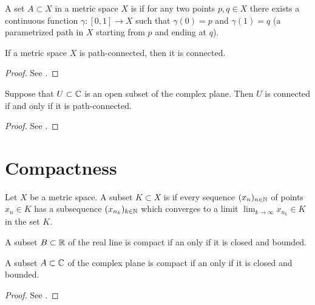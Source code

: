 \begin{definition}
  \label{def:path_connected}
  A set $A \subset X$ in a metric space $X$
  is  if for any two points $p, q \in X$
  there exists a continuous function $\gamma \colon [0,1] \to X$
  such that $\gamma(0) = p$ and $\gamma(1) = q$
  (a parametrized path in $X$ starting from $p$ and ending at $q$).
\end{definition}

\begin{lemma}
  \label{lem:path_connected_implies_connected}
  If a metric space $X$ is path-connected, then it is connected.
\end{lemma}
\begin{proof}
  See \MetSpCourse{}.
\end{proof}

\begin{lemma}
  \label{lem:open_connected_iff_path_connected}
  Suppose that $U \subset \mathbb{C}$ is an open subset of the complex plane.
  Then $U$ is connected if and only if it is path-connected.
\end{lemma}
\begin{proof}
  See \MetSpCourse{}.
\end{proof}

\section{Compactness}

\begin{definition}[Compactness]
  \label{def:compact}
  Let $X$ be a metric space.
  A subset $K \subset X$ is  if every sequence
  $(x_n)_{n \in \mathbb{N}}$ of points $x_n \in K$ has a subsequence
  $(x_{n_k})_{k \in \mathbb{N}}$ which converges to a limit
  $\lim_{k \to \infty} x_{n_k} \in K$ in the set $K$.
\end{definition}

\begin{theorem}
  \label{thm:bolzano_weierstrass}
  A subset $B \subset \mathbb{R}$ of the real line is compact
  if an only if it is closed and bounded.

  A subset $A \subset \mathbb{C}$ of the complex plane is compact
  if an only if it is closed and bounded.
\end{theorem}
\begin{proof}
  See \MetSpCourse{}.
\end{proof}

